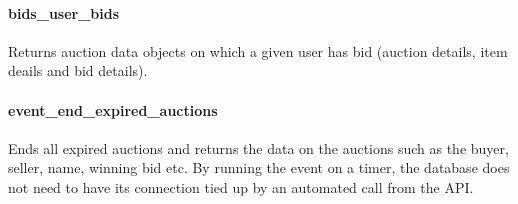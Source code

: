 \paragraph{bids\_user\_bids}\label{bidsux5fuserux5fbids}

Returns auction data objects on which a given user has bid (auction
details, item deails and bid details).

\begin{Shaded}
\begin{Highlighting}[]
  \NormalTok{(}\NormalTok{))}
        
        
        
      
      \NormalTok{;}
\end{Highlighting}
\end{Shaded}

\paragraph{event\_end\_expired\_auctions}\label{eventux5fendux5fexpiredux5fauctions}

Ends all expired auctions and returns the data on the auctions such as
the buyer, seller, name, winning bid etc. By running the event on a
timer, the database does not need to have its connection tied up by an
automated call from the API.

